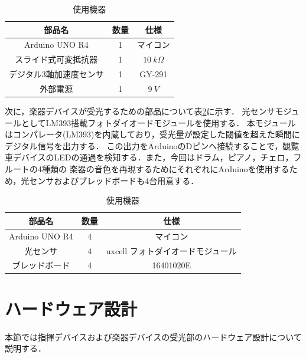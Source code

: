 \documentclass[lualatex,book,paper=a4paper,jafontsize=11.5pt,jafontscale=1.05,openany]{jlreq}
\begin{document}
\begin{table}[h]
  \centering
  \caption{使用機器}
  \label{table:siki}
  \begin{tabular}{c|c|c}
  
  \hline
  部品名 & 数量 & 仕様 \\\hline\hline
  Arduino UNO R4 & 1 & マイコン\\\hline
  スライド式可変抵抗器 & 1 & $\SI{10}{kΩ}$\\\hline
  デジタル3軸加速度センサ & 1 & GY-291\\\hline
  外部電源 & 1 & $\SI{9}{V}$\\\hline

  \end{tabular}
\end{table}

次に，楽器デバイスが受光するための部品について表\ref{table:ota}に示す．
光センサモジュールとしてLM393搭載フォトダイオードモジュールを使用する．
本モジュールはコンパレータ(LM393)を内蔵しており，受光量が設定した閾値を超えた瞬間にデジタル信号を出力する．
この出力をArduinoのDピンへ接続することで，観覧車デバイスのLEDの通過を検知する．また，今回はドラム，ピアノ，チェロ，フルートの4種類の
楽器の音色を再現するためにそれぞれにArduinoを使用するため，光センサおよびブレッドボードも4台用意する．




\begin{table}[h]
        \centering
        \caption{使用機器}
        \label{table:ota}
        \begin{tabular}{c|c|c}
        
        \hline
        部品名 & 数量 & 仕様 \\\hline\hline
        Arduino UNO R4 & 4 & マイコン\\\hline
        光センサ & 4 & uxcell フォトダイオードモジュール\\\hline
        ブレッドボード & 4 & 16401020E\\\hline
      
        \end{tabular}
\end{table}

\section{ハードウェア設計}

本節では指揮デバイスおよび楽器デバイスの受光部のハードウェア設計について説明する．
\end{document}

